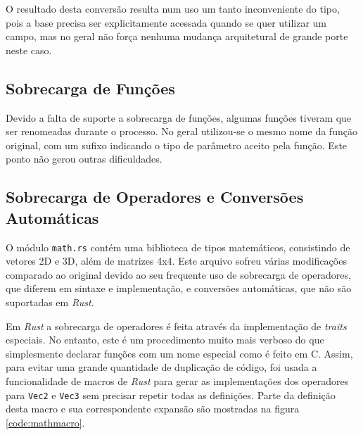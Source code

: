 \documentclass[tg]{mdtufsm}
\def\Cpp{{C\nolinebreak[4]\raisebox{.20ex}{\small\bf++}}}
\begin{document}
O resultado desta conversão resulta num uso um tanto inconveniente do tipo, pois a base precisa ser explicitamente acessada quando se quer utilizar um campo, mas no geral não força nenhuma mudança arquitetural de grande porte neste caso.

\subsection{Sobrecarga de Funções}

Devido a falta de suporte a sobrecarga de funções, algumas funções tiveram que ser renomeadas durante o processo. No geral utilizou-se o mesmo nome da função original, com um sufixo indicando o tipo de parâmetro aceito pela função. Este ponto não gerou outras dificuldades.

\subsection{Sobrecarga de Operadores e Conversões Automáticas}

O módulo \texttt{math.rs} contém uma biblioteca de tipos matemáticos, consistindo de vetores 2D e 3D, além de matrizes 4x4. Este arquivo sofreu várias modificações comparado ao original devido ao seu frequente uso de sobrecarga de operadores, que diferem em sintaxe e implementação, e conversões automáticas, que não são suportadas em \emph{Rust}.

Em \emph{Rust} a sobrecarga de operadores é feita através da implementação de \emph{traits} especiais. No entanto, este é um procedimento muito mais verboso do que simplesmente declarar funções com um nome especial como é feito em \Cpp. Assim, para evitar uma grande quantidade de duplicação de código, foi usada a funcionalidade de macros de \emph{Rust} para gerar as implementações dos operadores para \texttt{Vec2} e \texttt{Vec3} sem precisar repetir todas as definições. Parte da definição desta macro e sua correspondente expansão são mostradas na figura \ref{code:mathmacro}.
\end{document}
